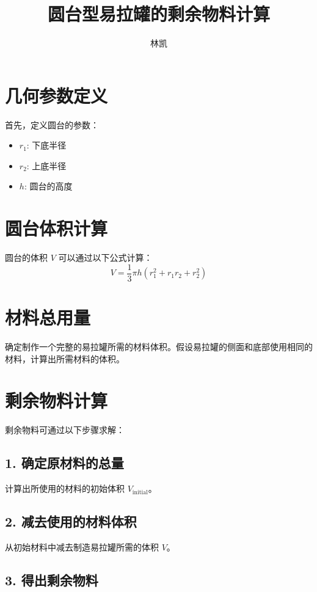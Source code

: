 \documentclass{article}
\begin{document}
\title{圆台型易拉罐的剩余物料计算}
\author{林凯}
\date{}
\maketitle

\section{几何参数定义}

首先，定义圆台的参数：
\begin{itemize}
    \item \( r_1 \): 下底半径
    \item \( r_2 \): 上底半径
    \item \( h \): 圆台的高度
\end{itemize}

\section{圆台体积计算}

圆台的体积 \( V \) 可以通过以下公式计算：
\[
V = \frac{1}{3} \pi h (r_1^2 + r_1 r_2 + r_2^2)
\]

\section{材料总用量}

确定制作一个完整的易拉罐所需的材料体积。假设易拉罐的侧面和底部使用相同的材料，计算出所需材料的体积。

\section{剩余物料计算}

剩余物料可通过以下步骤求解：

\subsection{1. 确定原材料的总量}

计算出所使用的材料的初始体积 \( V_{\text{initial}} \)。

\subsection{2. 减去使用的材料体积}

从初始材料中减去制造易拉罐所需的体积 \( V \)。

\subsection{3. 得出剩余物料}
\end{document}
